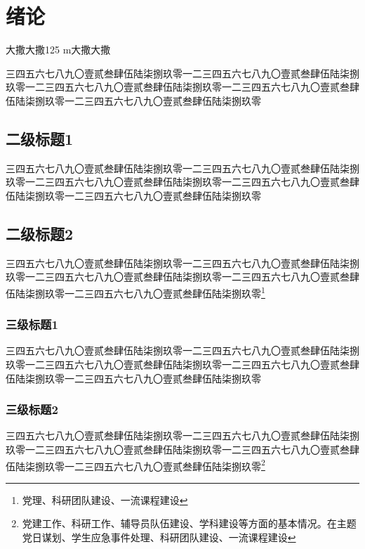 \documentclass[master,academic]{ysuthesis} %
\begin{document}

	\customizedtableofcontents

	\chapter{绪论}
		大撒大撒125 m大撒大撒

		三四五六七八九〇壹贰叁肆伍陆柒捌玖零一二三四五六七八九〇壹贰叁肆伍陆柒捌玖零一二三四五六七八九〇壹贰叁肆伍陆柒捌玖零一二三四五六七八九〇壹贰叁肆伍陆柒捌玖零一二三四五六七八九〇壹贰叁肆伍陆柒捌玖零

	\section{二级标题1}

		三四五六七八九〇壹贰叁肆伍陆柒捌玖零一二三四五六七八九〇壹贰叁肆伍陆柒捌玖零一二三四五六七八九〇壹贰叁肆伍陆柒捌玖零一二三四五六七八九〇壹贰叁肆伍陆柒捌玖零一二三四五六七八九〇壹贰叁肆伍陆柒捌玖零

	\section{二级标题2}

		三四五六七八九〇壹贰叁肆伍陆柒捌玖零一二三四五六七八九〇壹贰叁肆伍陆柒捌玖零一二三四五六七八九〇壹贰叁肆伍陆柒捌玖零一二三四五六七八九〇壹贰叁肆伍陆柒捌玖零一二三四五六七八九〇壹贰叁肆伍陆柒捌玖零\footnote{党理、科研团队建设、一流课程建设}


	\subsection{三级标题1}

		三四五六七八九〇壹贰叁肆伍陆柒捌玖零一二三四五六七八九〇壹贰叁肆伍陆柒捌玖零一二三四五六七八九〇壹贰叁肆伍陆柒捌玖零一二三四五六七八九〇壹贰叁肆伍陆柒捌玖零一二三四五六七八九〇壹贰叁肆伍陆柒捌玖零

	\subsection{三级标题2}

		三四五六七八九〇壹贰叁肆伍陆柒捌玖零一二三四五六七八九〇壹贰叁肆伍陆柒捌玖零一二三四五六七八九〇壹贰叁肆伍陆柒捌玖零一二三四五六七八九〇壹贰叁肆伍陆柒捌玖零一二三四五六七八九〇壹贰叁肆伍陆柒捌玖零\footnote{党建工作、科研工作、辅导员队伍建设、学科建设等方面的基本情况。在主题党日谋划、学生应急事件处理、科研团队建设、一流课程建设}
\end{document}
